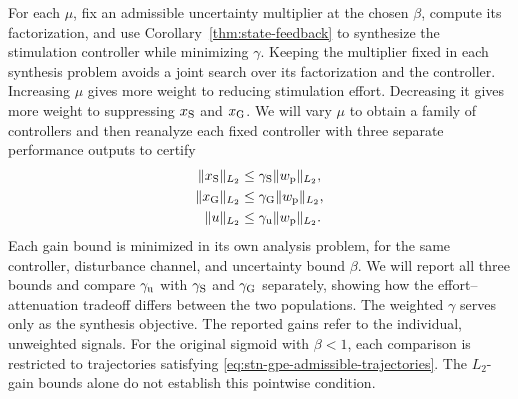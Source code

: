 For each $\mu$, fix an admissible uncertainty multiplier at the chosen
$\beta$, compute its factorization, and use
Corollary~\ref{thm:state-feedback} to synthesize the stimulation controller
while minimizing $\gamma$. Keeping the multiplier fixed in each synthesis
problem avoids a joint search over its factorization and the controller.
Increasing $\mu$ gives more weight to reducing stimulation effort.
Decreasing it gives more weight to suppressing $x_{{\mathrm{S}}}$ and
$x_{{\mathrm{G}}}$. We will vary $\mu$ to obtain a family of controllers and
then reanalyze each fixed controller with three separate performance
outputs to certify
\begin{equation*}
\begin{aligned}
\|x_{{\mathrm{S}}}\|_{L_2}&\leq\gamma_{{\mathrm{S}}}\|w_{{\mathrm{p}}}\|_{L_2},\\
\|x_{{\mathrm{G}}}\|_{L_2}&\leq\gamma_{{\mathrm{G}}}\|w_{{\mathrm{p}}}\|_{L_2},\\
\|u\|_{L_2}&\leq\gamma_{{\mathrm{u}}}\|w_{{\mathrm{p}}}\|_{L_2}.
\end{aligned}
\end{equation*}
Each gain bound is minimized in its own analysis problem, for the same
controller, disturbance channel, and uncertainty bound $\beta$.
We will report all three bounds and compare $\gamma_{{\mathrm{u}}}$ with
$\gamma_{{\mathrm{S}}}$ and $\gamma_{{\mathrm{G}}}$ separately, showing how the
effort--attenuation tradeoff differs between the two populations.
The weighted $\gamma$ serves only as the synthesis objective. The
reported gains refer to the individual, unweighted signals.
For the original sigmoid with
$\beta<1$, each comparison is restricted to trajectories satisfying
\eqref{eq:stn-gpe-admissible-trajectories}. The $L_2$-gain bounds alone
do not establish this pointwise condition.
